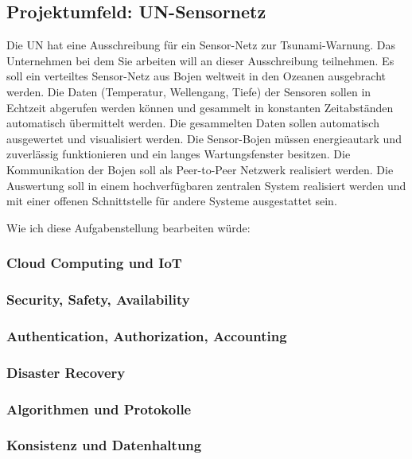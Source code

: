 \documentclass[letterpaper, 12pt]{article}
\let\tempsubsection\subsection
\renewcommand\subsection[1]{\vspace{0cm}\tempsubsection{#1}\vspace{0cm}}
\let\tempsubsubsection\subsubsection
\renewcommand\subsubsection[1]{\vspace{0cm}\tempsubsubsection{#1}\vspace{0cm}}
\begin{document}
\clearpage

\subsection{Projektumfeld: UN-Sensornetz}

Die UN hat eine Ausschreibung für ein Sensor-Netz zur Tsunami-Warnung.
Das Unternehmen bei dem Sie arbeiten will an dieser Ausschreibung
teilnehmen.
Es soll ein verteiltes Sensor-Netz aus Bojen weltweit in den Ozeanen
ausgebracht werden.
Die Daten (Temperatur, Wellengang, Tiefe) der Sensoren sollen in
Echtzeit abgerufen werden können und gesammelt in konstanten
Zeitabständen automatisch übermittelt werden.
Die gesammelten Daten sollen automatisch ausgewertet und visualisiert
werden. Die Sensor-Bojen müssen energieautark und zuverlässig
funktionieren und ein langes Wartungsfenster besitzen.
Die Kommunikation der Bojen soll als Peer-to-Peer Netzwerk realisiert
werden.
Die Auswertung soll in einem hochverfügbaren zentralen System realisiert
werden und mit einer offenen Schnittstelle für andere Systeme
ausgestattet sein.

Wie ich diese Aufgabenstellung bearbeiten würde:

\subsubsection{Cloud Computing und IoT}


\subsubsection{Security, Safety, Availability}

\subsubsection{Authentication, Authorization, Accounting}

\subsubsection{Disaster Recovery}

\subsubsection{Algorithmen und Protokolle}

\subsubsection{Konsistenz und Datenhaltung}

\clearpage


\end{document}

